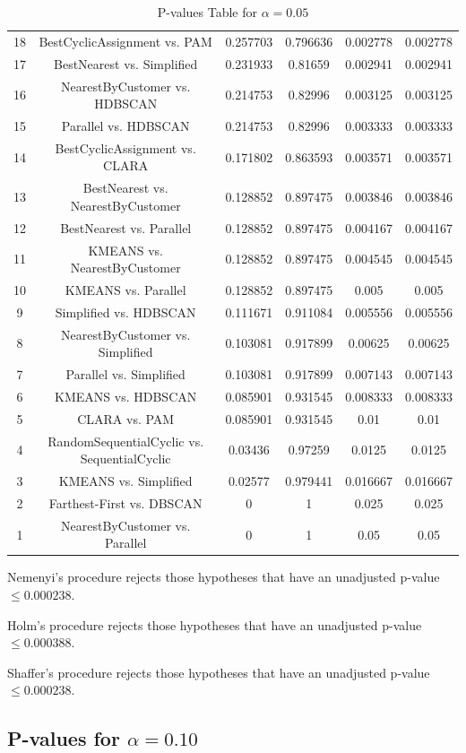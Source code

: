 \documentclass[a4paper,10pt]{article}
\begin{document}
\begin{landscape}
\begin{table}[!htp]
\begin{tabular}{cccccc}
18&BestCyclicAssignment vs. PAM&0.257703&0.796636&0.002778&0.002778\\
17&BestNearest vs. Simplified&0.231933&0.81659&0.002941&0.002941\\
16&NearestByCustomer vs. HDBSCAN&0.214753&0.82996&0.003125&0.003125\\
15&Parallel vs. HDBSCAN&0.214753&0.82996&0.003333&0.003333\\
14&BestCyclicAssignment vs. CLARA&0.171802&0.863593&0.003571&0.003571\\
13&BestNearest vs. NearestByCustomer&0.128852&0.897475&0.003846&0.003846\\
12&BestNearest vs. Parallel&0.128852&0.897475&0.004167&0.004167\\
11&KMEANS vs. NearestByCustomer&0.128852&0.897475&0.004545&0.004545\\
10&KMEANS vs. Parallel&0.128852&0.897475&0.005&0.005\\
9&Simplified vs. HDBSCAN&0.111671&0.911084&0.005556&0.005556\\
8&NearestByCustomer vs. Simplified&0.103081&0.917899&0.00625&0.00625\\
7&Parallel vs. Simplified&0.103081&0.917899&0.007143&0.007143\\
6&KMEANS vs. HDBSCAN&0.085901&0.931545&0.008333&0.008333\\
5&CLARA vs. PAM&0.085901&0.931545&0.01&0.01\\
4&RandomSequentialCyclic vs. SequentialCyclic&0.03436&0.97259&0.0125&0.0125\\
3&KMEANS vs. Simplified&0.02577&0.979441&0.016667&0.016667\\
2&Farthest-First vs. DBSCAN&0&1&0.025&0.025\\
1&NearestByCustomer vs. Parallel&0&1&0.05&0.05\\
\hline
\end{tabular}
\caption{P-values Table for $\alpha=0.05$}
\end{table}Nemenyi's procedure rejects those hypotheses that have an unadjusted p-value $\le0.000238$.

Holm's procedure rejects those hypotheses that have an unadjusted p-value $\le0.000388$.

Shaffer's procedure rejects those hypotheses that have an unadjusted p-value $\le0.000238$.

\pagebreak

\subsection{P-values for $\alpha=0.10$}


\end{landscape}
\end{document}
